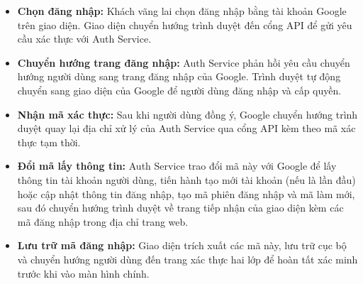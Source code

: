 \begin{itemize}

\item \textbf{Chọn đăng nhập:}
Khách vãng lai chọn đăng nhập bằng tài khoản Google trên giao diện.
Giao diện chuyển hướng trình duyệt đến cổng API để gửi yêu cầu xác thực với Auth Service.

\item \textbf{Chuyển hướng trang đăng nhập:}
Auth Service phản hồi yêu cầu chuyển hướng người dùng sang trang đăng nhập của Google.
Trình duyệt tự động chuyển sang giao diện của Google để người dùng đăng nhập và cấp quyền.

\item \textbf{Nhận mã xác thực:}
Sau khi người dùng đồng ý,
Google chuyển hướng trình duyệt quay lại địa chỉ xử lý của Auth Service qua cổng API kèm theo mã xác thực tạm thời.

\item \textbf{Đổi mã lấy thông tin:}
Auth Service trao đổi mã này với Google để lấy thông tin tài khoản người dùng,
tiến hành tạo mới tài khoản (nếu là lần đầu)
hoặc cập nhật thông tin đăng nhập,
tạo mã phiên đăng nhập và mã làm mới,
sau đó chuyển hướng trình duyệt
về trang tiếp nhận của giao diện kèm các mã đăng nhập trong địa chỉ trang web.

\item \textbf{Lưu trữ mã đăng nhập:}
Giao diện trích xuất các mã này,
lưu trữ cục bộ
và chuyển hướng người dùng đến trang xác thực hai lớp
để hoàn tất xác minh trước khi vào màn hình chính.
\end{itemize}
